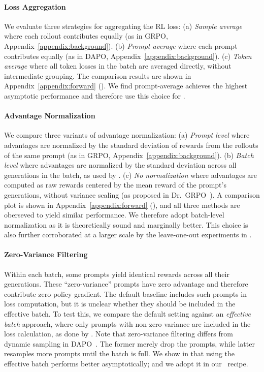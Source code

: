 \paragraph{Loss Aggregation}

We evaluate three strategies for aggregating the RL loss: (a) \emph{Sample average} where each rollout contributes equally (as in GRPO, Appendix~\ref{appendix:background}). (b) \emph{Prompt average} where each prompt contributes equally (as in DAPO, Appendix~\ref{appendix:background}). (c) \emph{Token average} where all token losses in the batch are averaged directly, without intermediate grouping. The comparison results are shown in Appendix~\ref{appendix:forward} ().
We find prompt-average achieves the highest asymptotic performance and therefore use this choice for \scalerl. 


\paragraph{Advantage Normalization}

We compare three variants of advantage normalization: (a) \emph{Prompt level} where advantages are normalized by the standard deviation of rewards from the rollouts of the same prompt (as in GRPO, Appendix~\ref{appendix:background}). (b) \emph{Batch level} where advantages are normalized by the standard deviation across all generations in the batch, as used by \citet{hu2025reinforce_pp,rastogi2025magistral}. (c) \emph{No normalization} where advantages are computed as raw rewards centered by the mean reward of the prompt’s generations, without variance scaling (as proposed in Dr.\ GRPO~\citep{dr_grpo}). A comparison plot is shown in Appendix~\ref{appendix:forward} (), and all three methods are oberseved to yield similar performance. We therefore adopt batch-level normalization as it is theoretically sound and marginally better. This choice is also further corroborated at a larger scale by the leave-one-out experiments in .

\paragraph{Zero-Variance Filtering}
\label{sec:batch_definition}

Within each batch, some prompts yield identical rewards across all their generations. 
These ``zero-variance'' prompts have zero advantage and therefore contribute zero policy gradient. 
The default baseline includes such prompts in loss computation, but it is unclear whether they should be included in the effective batch. 
To test this, we compare the default setting against an \emph{effective batch} approach, where only prompts with non-zero variance are included in the loss calculation, as done by \citet{seed2025seed1}. Note that zero-variance filtering differs from dynamic sampling in DAPO~\citep{yu2025dapo}. The former merely drop the prompts, while latter resamples more prompts until the batch is full.
We show in  that using the effective batch performs better asymptotically; and we adopt it in our \scalerl\ recipe.

